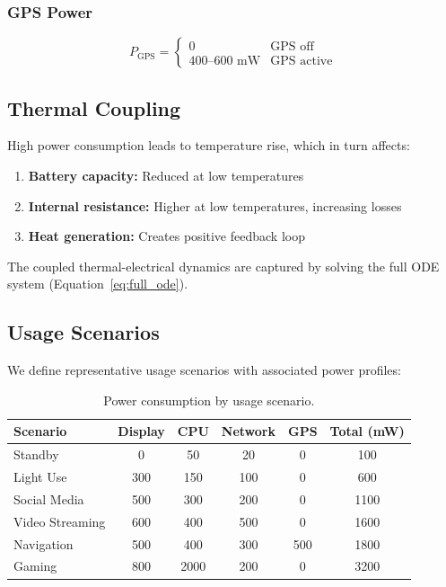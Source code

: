 \subsubsection{GPS Power}
\begin{equation}
    P_{\text{GPS}} = \begin{cases}
        0 & \text{GPS off} \\
        400\text{--}600 \text{ mW} & \text{GPS active}
    \end{cases}
\end{equation}

\subsection{Thermal Coupling}
\label{subsec:thermal_coupling}

High power consumption leads to temperature rise, which in turn affects:
\begin{enumerate}
    \item \textbf{Battery capacity:} Reduced at low temperatures
    \item \textbf{Internal resistance:} Higher at low temperatures, increasing losses
    \item \textbf{Heat generation:} Creates positive feedback loop
\end{enumerate}

The coupled thermal-electrical dynamics are captured by solving the full ODE system (Equation~\ref{eq:full_ode}).

\subsection{Usage Scenarios}
\label{subsec:scenarios}

We define representative usage scenarios with associated power profiles:

\begin{table}[H]
    \centering
    \caption{Power consumption by usage scenario.}
    \label{tab:scenarios}
    \begin{tabular}{lccccc}
        \toprule
        \textbf{Scenario} & \textbf{Display} & \textbf{CPU} & \textbf{Network} & \textbf{GPS} & \textbf{Total (mW)} \\
        \midrule
        Standby & 0 & 50 & 20 & 0 & 100 \\
        Light Use & 300 & 150 & 100 & 0 & 600 \\
        Social Media & 500 & 300 & 200 & 0 & 1100 \\
        Video Streaming & 600 & 400 & 500 & 0 & 1600 \\
        Navigation & 500 & 400 & 300 & 500 & 1800 \\
        Gaming & 800 & 2000 & 200 & 0 & 3200 \\
        \bottomrule
    \end{tabular}
\end{table}

